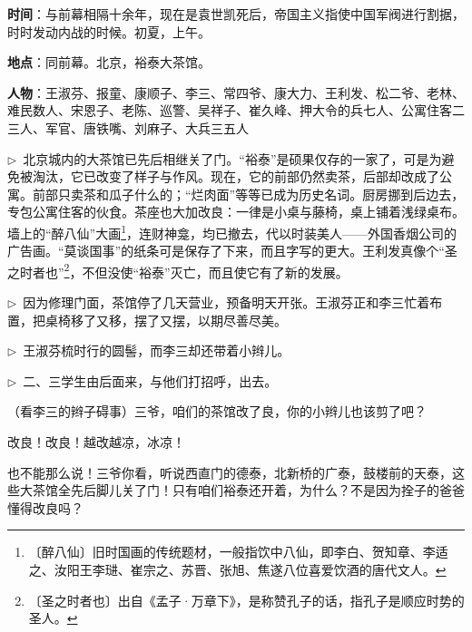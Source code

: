 \documentclass[12pt,UTF-8,openany]{ctexbook}
\begin{document}
\begin{normalsize}
    
    \noindent \textbf{时间}：与前幕相隔十余年，现在是袁世凯死后，帝国主义指使中国军阀进行割据，时时发动内战的时候。初夏，上午。
    
    \noindent \textbf{地点}：同前幕。北京，裕泰大茶馆。
    
    \noindent \textbf{人物}：王淑芬、报童、康顺子、李三、常四爷、康大力、王利发、松二爷、老林、难民数人、宋恩子、老陈、巡警、吴祥子、崔久峰、押大令的兵七人、公寓住客二三人、军官、唐铁嘴、刘麻子、大兵三五人
    
    \noindent $\triangleright$~北京城内的大茶馆已先后相继关了门。“裕泰”是硕果仅存的一家了，可是为避免被淘汰，它已改变了样子与作风。现在，它的前部仍然卖茶，后部却改成了公寓。前部只卖茶和瓜子什么的；“烂肉面”等等已成为历史名词。厨房挪到后边去，专包公寓住客的伙食。茶座也大加改良：一律是小桌与藤椅，桌上铺着浅绿桌布。墙上的“醉八仙”大画\footnote{〔醉八仙〕旧时国画的传统题材，一般指饮中八仙，即李白、贺知章、李适之、汝阳王李琎、崔宗之、苏晋、张旭、焦遂八位喜爱饮酒的唐代文人。}，连财神龛，均已撤去，代以时装美人——外国香烟公司的广告画。“莫谈国事”的纸条可是保存了下来，而且字写的更大。王利发真像个“圣之时者也”\footnote{〔圣之时者也〕出自《孟子·万章下》，是称赞孔子的话，指孔子是顺应时势的圣人。}，不但没使“裕泰”灭亡，而且使它有了新的发展。
    
    \noindent $\triangleright$~因为修理门面，茶馆停了几天营业，预备明天开张。王淑芬正和李三忙着布置，把桌椅移了又移，摆了又摆，以期尽善尽美。
    
    \noindent $\triangleright$~王淑芬梳时行的圆髻，而李三却还带着小辫儿。
    
    \noindent $\triangleright$~二、三学生由后面来，与他们打招呼，出去。
    
    \begin{description}[itemsep=0.5ex,leftmargin=4.5em,labelwidth=4em]
    
    \item[{\color{script-4-0} 王淑芬}]（看李三的辫子碍事）三爷，咱们的茶馆改了良，你的小辫儿也该剪了吧？
    
    \item[{\color{script-4-1} 李三}]改良！改良！越改越凉，冰凉！
    
    \item[{\color{script-4-0} 王淑芬}]也不能那么说！三爷你看，听说西直门的德泰，北新桥的广泰，鼓楼前的天泰，这些大茶馆全先后脚儿关了门！只有咱们裕泰还开着，为什么？不是因为拴子的爸爸懂得改良吗？
    

\end{description}
\end{normalsize}
\end{document}
